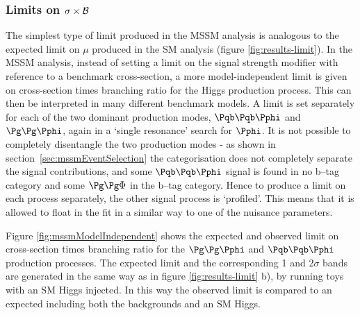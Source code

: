\subsubsection{Limits on $\sigma \times \cal{B}$}

The simplest type of limit produced in the \ac{MSSM} analysis is analogous to the 
expected limit on $\mu$ produced in the \ac{SM} analysis (figure
\ref{fig:results-limit}). In the \ac{MSSM} analysis, instead of setting a limit
on the signal strength modifier with reference to a benchmark cross-section, a
more model-independent limit is given on cross-section times branching ratio
for the Higgs production process. This can then be interpreted in many different
benchmark models. A limit is set separately for each of the two dominant production modes,
$\Pqb\Pqb\Pphi$ and $\Pg\Pg\Pphi$, again in a `single
resonance' search for $\Pphi$. It is not possible to
completely disentangle the two production modes - as shown in
section~\ref{sec:mssmEventSelection} the categorisation does not completely
separate the signal contributions, and some $\Pqb\Pqb\Pphi$ signal is
found in no b--tag category and some $\Pg\Pg\Phi$ in the b--tag category. Hence
to produce a limit on each process separately, the other signal process is
`profiled'. This means that it is allowed to float in the fit in a similar way
to one of the nuisance parameters. 

Figure \ref{fig:mssmModelIndependent} shows the expected and observed limit on
cross-section times branching ratio for the $\Pg\Pg\Pphi$ and $\Pqb\Pqb\Pphi$
production processes. The expected limit and the corresponding 1 and 2$\sigma$ bands
are generated in the same way as in figure \ref{fig:results-limit} b), by
running toys with an \ac{SM} Higgs injected.
In this way the observed limit is compared to an expected including both the
backgrounds and an \ac{SM} Higgs. 

